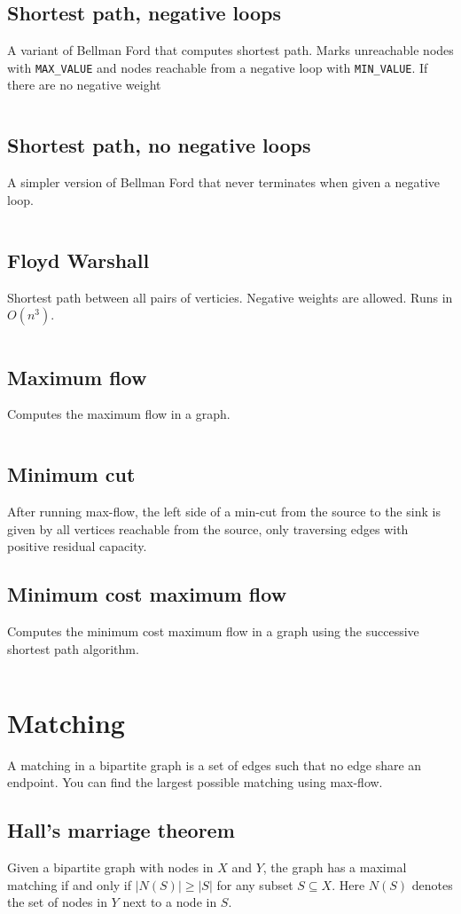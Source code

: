 \documentclass[10pt,a4paper,landscape,oneside]{amsart}
\newcommand{\code}[1]{\inputminted[fontsize=\large,tabsize=2,baselinestretch=1]{java}{#1}}
\begin{document}
\begin{multicols*}{2}
\subsection{Shortest path, negative loops}
A variant of Bellman Ford that computes shortest path. Marks unreachable nodes with
\verb|MAX_VALUE| and nodes reachable from a negative loop with \verb|MIN_VALUE|.
If there are no negative weight
\code{graph/shortest-path.java}
\subsection{Shortest path, no negative loops}
A simpler version of Bellman Ford that never terminates when given a negative loop.
\code{graph/shortest-path-noloop.java}
\subsection{Floyd Warshall}
Shortest path between all pairs of verticies. Negative weights are allowed. Runs in
\(O(n^3)\).
\code{graph/floyd-warshall.java}
\subsection{Maximum flow}
Computes the maximum flow in a graph.
\code{graph/max-flow.java}
\subsection{Minimum cut}
After running max-flow, the left side of a min-cut from the source to the sink is given
by all vertices reachable from the source, only traversing edges with positive residual
capacity.
\subsection{Minimum cost maximum flow}
Computes the minimum cost maximum flow in a graph using the successive shortest path
algorithm.
\code{graph/min-cost-max-flow.java}

\section{Matching}
A matching in a bipartite graph is a set of edges such that no edge share an endpoint.
You can find the largest possible matching using max-flow.
\subsection{Hall's marriage theorem}
Given a bipartite graph with nodes in \(X\) and \(Y\), the graph has a maximal matching
if and only if \(|N(S)| \geq |S|\) for any subset \(S \subseteq X\). Here \(N(S)\)
denotes the set of nodes in \(Y\) next to a node in \(S\).

\end{multicols*}
\end{document}
